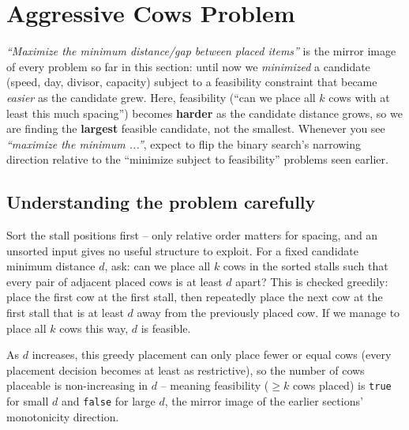 \section{Aggressive Cows Problem}
\label{sec:bs-aggressive-cows}


\begin{patternbox}
\emph{``Maximize the minimum distance/gap between placed items''} is the
mirror image of every problem so far in this section: until now we
\emph{minimized} a candidate (speed, day, divisor, capacity) subject to a
feasibility constraint that became \emph{easier} as the candidate grew.
Here, feasibility (``can we place all $k$ cows with at least this much
spacing'') becomes \textbf{harder} as the candidate distance grows, so we
are finding the \textbf{largest} feasible candidate, not the smallest.
Whenever you see \emph{``maximize the minimum ...''}, expect to flip the
binary search's narrowing direction relative to the ``minimize subject to
feasibility'' problems seen earlier.
\end{patternbox}

\subsection*{Understanding the problem carefully}

Sort the stall positions first -- only relative order matters for spacing,
and an unsorted input gives no useful structure to exploit. For a fixed
candidate minimum distance $d$, ask: can we place all $k$ cows in the
sorted stalls such that every pair of adjacent placed cows is at least $d$
apart? This is checked greedily: place the first cow at the first stall,
then repeatedly place the next cow at the first stall that is at least $d$
away from the previously placed cow. If we manage to place all $k$ cows
this way, $d$ is feasible.

As $d$ increases, this greedy placement can only place fewer or equal
cows (every placement decision becomes at least as restrictive), so the
number of cows placeable is non-increasing in $d$ -- meaning feasibility
($\ge k$ cows placed) is \texttt{true} for small $d$ and \texttt{false}
for large $d$, the mirror image of the earlier sections' monotonicity
direction.

